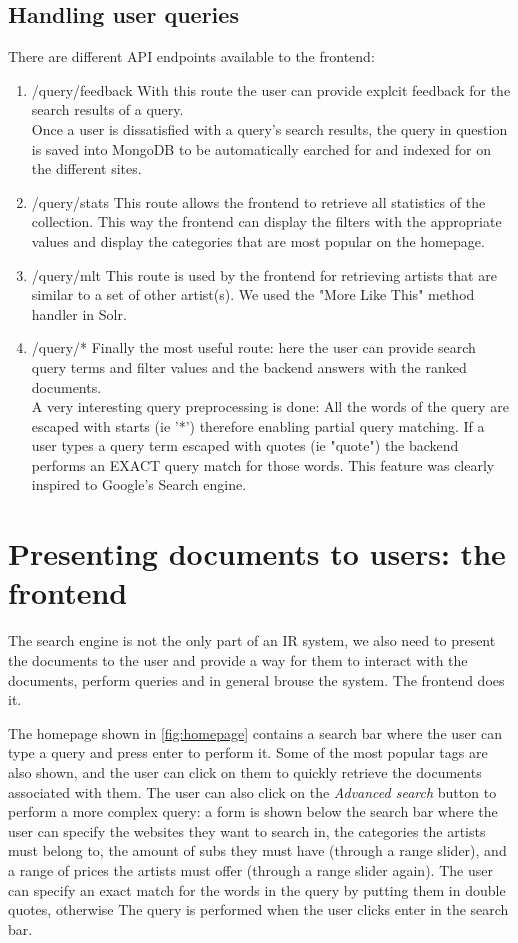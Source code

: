 \documentclass[tikz,14pt]{article}
\begin{document}
\subsection{Handling user queries} \label{sec:queries}
There are different API endpoints available to the frontend:\\
\begin{enumerate}
\item /query/feedback
With this route the user can provide explcit feedback for the search results of a query.\\
Once a user is dissatisfied with a query's search results, the query in question is saved into MongoDB to be automatically earched for and indexed for on the different sites.
\item /query/stats
This route allows the frontend to retrieve all statistics of the collection. This way the frontend can display the filters with the appropriate values and display the categories that are most popular on the homepage.
\item /query/mlt
This route is used by the frontend for retrieving artists that are similar to a set of other artist(s). We used the "More Like This" method handler in Solr.
\item /query/*
Finally the most useful route: here the user can provide search query terms and filter values and the backend answers with the ranked documents.\\
A very interesting query preprocessing is done: All the words of the query are escaped with starts (ie '*') therefore enabling partial query matching. If a user types a query term escaped with quotes (ie "quote") the backend performs an EXACT query match for those words. This feature was clearly inspired to Google's Search engine.\\
\end{enumerate}

\section{Presenting documents to users: the frontend} \label{sec:frontend}
The search engine is not the only part of an IR system, we also need to present the documents to the user and 
provide a way for them to interact with the documents, perform queries and in general brouse the system.
The frontend does it.

The homepage shown in \autoref{fig:homepage} contains a search bar where the user can type a query and press enter to perform it.
Some of the most popular tags are also shown, and the user can click on them to quickly retrieve the documents associated with them.
The user can also click on the \textit{Advanced search} button to perform a more complex query: 
a form is shown below the search bar where the user can specify the websites they want to search in,
the categories the artists must belong to, the amount of subs they must have (through a range slider), 
and a range of prices the artists must offer (through a range slider again).
The user can specify an exact match for the words in the query by putting them in double quotes, 
otherwise  
The query is performed when the user clicks enter in the search bar.
\end{document}
